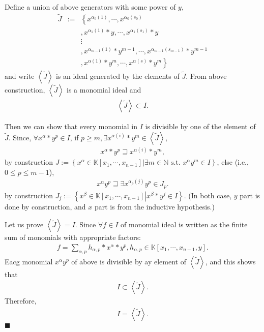 \documentclass[11pt]{book}
\begin{document}
Define a union of above generators with some power of $y$,
\begin{eqnarray}
\nonumber
\tilde{J} &:=& \left\{  x^{\alpha_0(1)}, \cdots,  x^{\alpha_0(s_0)} \right. \\
\nonumber && \left. , x^{\alpha_1(1)}*y , \cdots,  x^{\alpha_1(s_1)}*y \right. \\
\nonumber && \vdots \\
\nonumber && \left. , x^{\alpha_{m-1}(1)}*y^{m-1}, \cdots, x^{\alpha_{m-1}(s_{m-1})}*y^{m-1} \right. \\
&&\left. , x^{\alpha(1)}*y^m, \cdots, x^{\alpha(s)}*y^m \right\} 
\end{eqnarray}
and write $\left< \tilde{J} \right>$ is an ideal generated by the elements of $\tilde{J}$.
From above construction, $\left< \tilde{J} \right>$ is a monomial ideal and
\begin{eqnarray}
\label{JJsubsetI}
\left< \tilde{J} \right> \subset I.
\end{eqnarray}

Then we can show that every monomial in $I$ is divisible by one of the element of $\tilde{J}$.
Since, $\forall x^\alpha * y^p \in I$, if $p \geq m, \exists x^{\alpha(i)} * y^m \in \left< \tilde{J} \right>$,
\begin{eqnarray}
x^\alpha * y^p  \sqsupseteq x^{\alpha(i)} * y^m,
\end{eqnarray}
by construction $J := \left\{ \left. x^\alpha \in \mathbb{K}[x_1, \cdots, x_{n-1}] \right| \exists m \in \mathbb{N} \text{ s.t. } x^\alpha y^m \in I \right\}$, else (i.e., $0 \leq p \leq m-1$),
\begin{eqnarray}
x^\alpha y^p  \sqsupseteq \exists x^{\alpha_p(j)} y^p \in J_p.
\end{eqnarray}
by construction $J_j := \left\{ \left. x^\beta \in \mathbb{K}[x_1, \cdots, x_{n-1}] \right| x^\beta * y^j \in I \right\}$.
(In both case, $y$ part is done by construction, and $x$ part is from the inductive hypothesis.)

Let us prove $\left< \tilde{J} \right> = I$.
Since $\forall f \in I$ of monomial ideal is written as the finite sum of monomials with appropriate factors:
\begin{eqnarray}
f = \sum_{\alpha,p} h_{\alpha,p} * x^\alpha * y^p, h_{\alpha,p} \in \mathbb{K}[x_1, \cdots, x_{n-1},y].
\end{eqnarray}
Eacg monomial $x^\alpha y^p$ of above is divisible by ay element of $\left< \tilde{J} \right>$, and this shows that
\begin{eqnarray}
I \subset \left< \tilde{J} \right>.
\end{eqnarray}
Therefore,
\begin{eqnarray}
I = \left< \tilde{J} \right>.
\end{eqnarray}
$\blacksquare$
\end{document}
